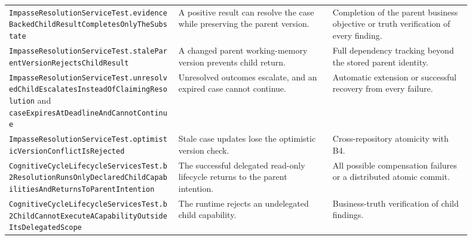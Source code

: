 \begin{longtable}{>{\raggedright\arraybackslash}p{0.33\linewidth} >{\raggedright\arraybackslash}p{0.30\linewidth} >{\raggedright\arraybackslash}p{0.27\linewidth}}
\texttt{Impasse\allowbreak Resolution\allowbreak Service\allowbreak Test.\allowbreak evidence\allowbreak Backed\allowbreak Child\allowbreak Result\allowbreak Completes\allowbreak Only\allowbreak The\allowbreak Substate} & A positive result can resolve the case while preserving the parent version. & Completion of the parent business objective or truth verification of every finding. \\
\texttt{Impasse\allowbreak Resolution\allowbreak Service\allowbreak Test.\allowbreak stale\allowbreak Parent\allowbreak Version\allowbreak Rejects\allowbreak Child\allowbreak Result} & A changed parent working-memory version prevents child return. & Full dependency tracking beyond the stored parent identity. \\
\texttt{Impasse\allowbreak Resolution\allowbreak Service\allowbreak Test.\allowbreak unresolved\allowbreak Child\allowbreak Escalates\allowbreak Instead\allowbreak Of\allowbreak Claiming\allowbreak Resolution} and \texttt{case\allowbreak Expires\allowbreak At\allowbreak Deadline\allowbreak And\allowbreak Cannot\allowbreak Continue} & Unresolved outcomes escalate, and an expired case cannot continue. & Automatic extension or successful recovery from every failure. \\
\texttt{Impasse\allowbreak Resolution\allowbreak Service\allowbreak Test.\allowbreak optimistic\allowbreak Version\allowbreak Conflict\allowbreak Is\allowbreak Rejected} & Stale case updates lose the optimistic version check. & Cross-repository atomicity with B4. \\
\texttt{Cognitive\allowbreak Cycle\allowbreak Lifecycle\allowbreak Services\allowbreak Test.\allowbreak b2\allowbreak Resolution\allowbreak Runs\allowbreak Only\allowbreak Declared\allowbreak Child\allowbreak Capabilities\allowbreak And\allowbreak Returns\allowbreak To\allowbreak Parent\allowbreak Intention} & The successful delegated read-only lifecycle returns to the parent intention. & All possible compensation failures or a distributed atomic commit. \\
\texttt{Cognitive\allowbreak Cycle\allowbreak Lifecycle\allowbreak Services\allowbreak Test.\allowbreak b2\allowbreak Child\allowbreak Cannot\allowbreak Execute\allowbreak ACapability\allowbreak Outside\allowbreak Its\allowbreak Delegated\allowbreak Scope} & The runtime rejects an undelegated child capability. & Business-truth verification of child findings. \\

\end{longtable}
